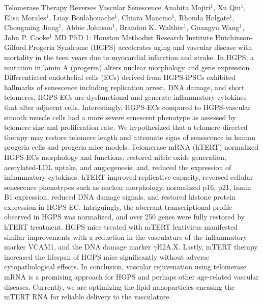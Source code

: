 \begin{addmargin}[2em]{0em}
\vspace{1.5ex}
\abs
{Telomerase Therapy Reverses Vascular Senescence}
{Anahita Mojiri$^{1}$, Xu Qiu$^{1}$, Elisa Morales$^{1}$, Luay Boulahouache$^{1}$, Chiara Mancino$^{1}$, Rhonda Holgate$^{1}$, Chongming Jiang$^{1}$, Abbie Johnson$^{1}$, Brandon K. Walther$^{1}$, Guangyu Wang$^{1}$, John P. Cooke$^{1}$ MD PhD}
{1: Houston Methodist Research Institute}
{Hutchinson-Gilford Progeria Syndrome (HGPS) accelerates aging and vascular disease with mortality in the teen years due to myocardial infarction and stroke. In HGPS, a mutation in lamin A (progerin) alters nuclear morphology and gene expression. Differentiated endothelial cells (ECs) derived from HGPS-iPSCs exhibited hallmarks of senescence including replication arrest, DNA damage, and short telomeres. HGPS-ECs are dysfunctional and generate inflammatory cytokines that alter adjacent cells. Interestingly, HGPS-ECs compared to HGPS-vascular smooth muscle cells had a more severe senescent phenotype as assessed by telomere size and proliferation rate. We hypothesized that a telomere-directed therapy may restore telomere length and attenuate signs of senescence in human progeria cells and progeria mice models.  Telomerase mRNA (hTERT) normalized HGPS-ECs morphology and functions; restored nitric oxide generation, acetylated-LDL uptake, and angiogenesis; and, reduced the expression of inflammatory cytokines. hTERT improved replicative capacity, reversed cellular senescence phenotypes such as nuclear morphology, normalized p16, p21, lamin B1 expression, reduced DNA damage signals, and restored histone protein expression in HGPS-EC. Intriguingly, the aberrant transcriptional profile observed in HGPS was normalized, and over 250 genes were fully restored by hTERT treatment.  HGPS mice treated with mTERT lentivirus manifested similar improvements with a reduction in the vasculature of the inflammatory marker VCAM1, and the DNA damage marker $\gamma$H2A.X. Lastly, mTERT therapy increased the lifespan of HGPS mice significantly without adverse cytopathological effects. In conclusion, vascular rejuvenation using telomerase mRNA is a promising approach for HGPS and perhaps other age-related vascular diseases. Currently, we are optimizing the lipid nanoparticles encasing the mTERT RNA for reliable delivery to the vasculature.}

\end{addmargin}


